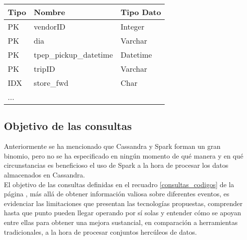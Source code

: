 \begin{table}[h!]
	\centering
	\begin{tabular}{|l||l|l|}
		
		\hline
		
		Tipo & Nombre & Tipo Dato \\
		
		\hline
		\hline
		
		PK & vendorID & Integer \\
		
		\hline
		
		PK & dia & Varchar \\
		
		\hline
		
		PK & tpep\_pickup\_datetime & Datetime \\
		
		\hline
		
		PK & tripID & Varchar \\
		
		\hline
		
		IDX & store\_fwd & Char \\
		
		\hline
		
		... &            &      \\
		
		\hline
		
	\end{tabular}
\end{table}

\subsection{Objetivo de las consultas}
\label{objetivo_consultas}

Anteriormente se ha mencionado que Cassandra y Spark forman un gran binomio, pero no se ha especificado en ningún momento de qué manera y en qué circunstancias es beneficioso el uso de Spark a la hora de procesar los datos almacenados en Cassandra.\\

El objetivo de las consultas definidas en el recuadro \ref{consultas_codigos} de la página \pageref{consultas_codigos}, más allá de obtener información valiosa sobre diferentes eventos, es evidenciar las limitaciones que presentan las tecnologías propuestas, comprender hasta que punto pueden llegar operando por sí solas y entender cómo se apoyan entre ellas para obtener una mejora sustancial, en comparación a herramientas tradicionales, a la hora de procesar conjuntos hercúleos de datos.\\

